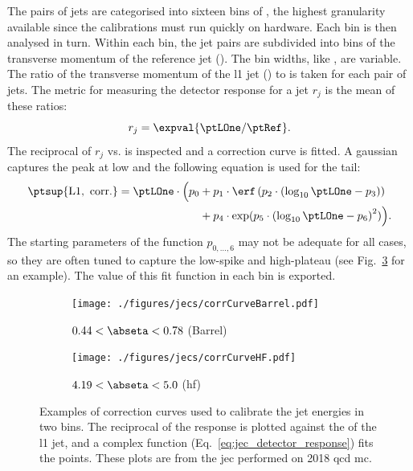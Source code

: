 The pairs of \glspl{jet} are categorised into sixteen bins of \abseta, the highest granularity available since the calibrations must run quickly on hardware. Each bin is then analysed in turn. Within each \abseta bin, the \gls{jet} pairs are subdivided into bins of the transverse momentum of the reference \gls{jet} (\ptRef). The bin widths, like \abseta, are variable. The ratio of the transverse momentum of the \acrshort{l1} \gls{jet} (\ptLOne) to \ptRef is taken for each pair of \glspl{jet}. The metric for measuring the detector response for a jet $r_j$ is the mean of these ratios:
\begin{equation}
    r_j = \expval{\ptLOne / \ptRef}.
    \label{eq:jec_detector_response}
\end{equation}
The reciprocal of $r_j$ vs. \ptLOne is inspected and a correction curve is fitted. A gaussian captures the peak at low \pt and the following equation is used for the tail:
\begin{equation} %
    \begin{aligned}
\ptsup{{\mathrm{L1, \ corr.}}} = \ptLOne \cdot \Big( p_0 &+ p_1 \cdot \erf \left(p_2 \cdot \left( \log_{10}\ptLOne - p_3 \right) \right) \\
&+ p_4 \cdot \exp(p_5 \cdot \left( \log_{10}\ptLOne - p_6 \right)^2 ) \Big).
    \end{aligned}
    \label{eq:corr_curve_jec_tail}
\end{equation}
The starting parameters of the function $p_{0,\ldots,6}$ may not be adequate for all cases, so they are often tuned to capture the low-\pt spike and high-\pt plateau (see Fig.~\ref{fig:detector_jecs_corr_curves} for an example). The value of this fit function in each \ptRef bin is exported.

\begin{figure}[htbp]
    \centering
    \begin{subfigure}[b]{0.49\textwidth}
        \texttt{[image: ./figures/jecs/corrCurveBarrel.pdf]}
        \caption{$\text{0.44} < \abseta < \text{0.78}$ (Barrel)}
        \label{fig:detector_jecs_corr_curve_Barrel}
    \end{subfigure}
    \hfill
    \begin{subfigure}[b]{0.49\textwidth}
        \texttt{[image: ./figures/jecs/corrCurveHF.pdf]}
        \caption{$\text{4.19} < \abseta < \text{5.0}$ (\acrshort{hf})}
        \label{fig:detector_jecs_corr_curve_HF}
    \end{subfigure}
\caption[Examples of correction curves used to calibrate the jet energies in two \abseta bins]{Examples of correction curves used to calibrate the \gls{jet} energies in two \abseta bins. The reciprocal of the response is plotted against the \pt of the \acrlong{l1} \gls{jet}, and a complex function (Eq.~\ref{eq:jec_detector_response}) fits the points. These plots are from the \acrlong{jec} performed on 2018 \acrshort{qcd} \acrlong{mc}.}
\label{fig:detector_jecs_corr_curves}
\end{figure}

